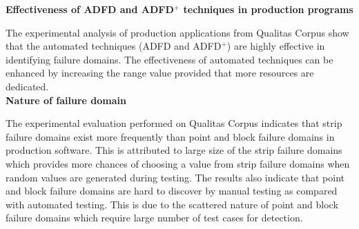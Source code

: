 \textbf{Effectiveness of ADFD and ADFD$^+$ techniques in production programs}

The experimental analysis of production applications from Qualitas Corpus show that the automated techniques (ADFD and ADFD$^+$) are highly effective in identifying failure domains. The effectiveness of automated techniques can be enhanced by increasing the range value provided that more resources are dedicated.\\


\textbf{Nature of failure domain}

The experimental evaluation performed on Qualitas Corpus indicates that strip failure domains exist more frequently than point and block failure domains in production software. This is attributed to large size of the strip failure domains which provides more chances of choosing a value from strip failure domains when random values are generated during testing. The results also indicate that point and block failure domains are hard to discover by manual testing as compared with automated testing. This is due to the scattered nature of point and block failure domains which require large number of test cases for detection. 





